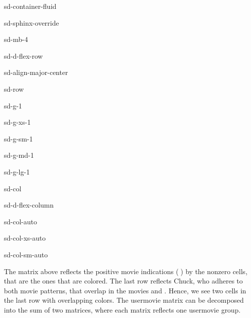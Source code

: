 \documentclass[letterpaper,10pt,english]{jupyterBook}
\begin{document}
\begin{sphinxuseclass}{sd-container-fluid}
\begin{sphinxuseclass}{sd-sphinx-override}
\begin{sphinxuseclass}{sd-mb-4}
\begin{sphinxuseclass}{sd-d-flex-row}
\begin{sphinxuseclass}{sd-align-major-center}
\begin{sphinxuseclass}{sd-row}
\begin{sphinxuseclass}{sd-g-1}
\begin{sphinxuseclass}{sd-g-xs-1}
\begin{sphinxuseclass}{sd-g-sm-1}
\begin{sphinxuseclass}{sd-g-md-1}
\begin{sphinxuseclass}{sd-g-lg-1}
\begin{sphinxuseclass}{sd-col}
\begin{sphinxuseclass}{sd-d-flex-column}
\begin{sphinxuseclass}{sd-col-auto}
\begin{sphinxuseclass}{sd-col-xs-auto}
\begin{sphinxuseclass}{sd-col-sm-auto}
\end{sphinxuseclass}
\end{sphinxuseclass}
\end{sphinxuseclass}
\end{sphinxuseclass}
\end{sphinxuseclass}
\end{sphinxuseclass}
\end{sphinxuseclass}
\end{sphinxuseclass}
\end{sphinxuseclass}
\end{sphinxuseclass}
\end{sphinxuseclass}
\end{sphinxuseclass}
\end{sphinxuseclass}
\end{sphinxuseclass}
\end{sphinxuseclass}
\end{sphinxuseclass}
\sphinxAtStartPar
The matrix above reflects the positive movie indications (🤩) by the nonzero cells, that are the ones that are colored. The last row reflects Chuck, who adheres to both movie patterns, that overlap in the movies  and . Hence, we see two cells in the last row with overlapping colors. The user\sphinxhyphen{}movie matrix can be decomposed into the sum of two matrices, where each matrix reflects one user\sphinxhyphen{}movie group.
\end{document}
